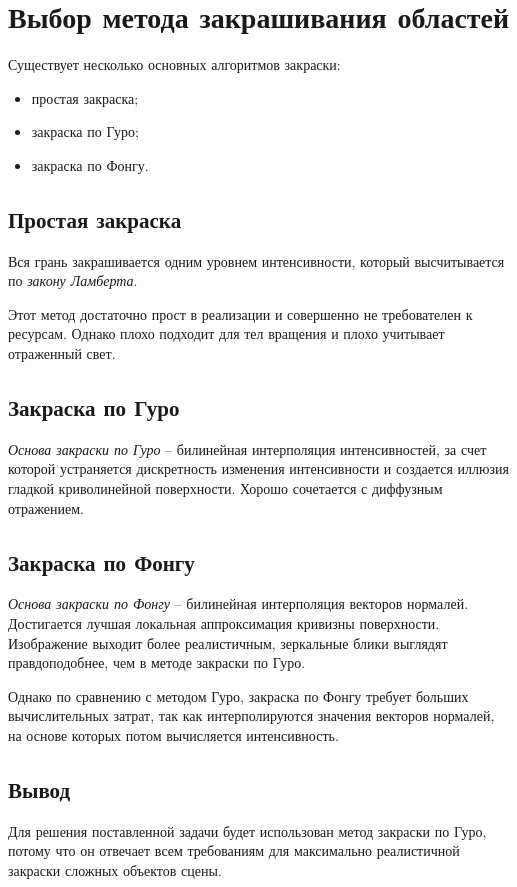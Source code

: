 \section{Выбор метода закрашивания областей}
Существует несколько основных алгоритмов закраски:
\begin{itemize} 
    \item простая закраска;
    \item закраска по Гуро; 
    \item закраска по Фонгу.
\end{itemize}  


\subsection{Простая закраска}

Вся грань закрашивается одним уровнем интенсивности, который высчитывается по \textit{закону Ламберта}.

Этот метод достаточно прост в реализации и совершенно не требователен к ресурсам. Однако плохо подходит для тел вращения и плохо учитывает отраженный свет.


\subsection{Закраска по Гуро}

\textit{Основа закраски по Гуро} – билинейная интерполяция интенсивностей, за счет которой устраняется дискретность изменения интенсивности и создается иллюзия гладкой криволинейной поверхности. Хорошо сочетается с диффузным отражением.


\subsection{Закраска по Фонгу}

\textit{Основа закраски по Фонгу} – билинейная интерполяция векторов нормалей. Достигается лучшая локальная аппроксимация кривизны поверхности. Изображение выходит более реалистичным, зеркальные блики выглядят правдоподобнее, чем в методе закраски по Гуро.

Однако по сравнению с методом Гуро, закраска по Фонгу требует больших вычислительных затрат, так как интерполируются значения векторов нормалей, на основе которых потом вычисляется интенсивность.


\subsection*{Вывод}
Для решения поставленной задачи будет использован метод закраски по Гуро, потому что он отвечает всем требованиям для максимально реалистичной закраски сложных объектов сцены.
 

